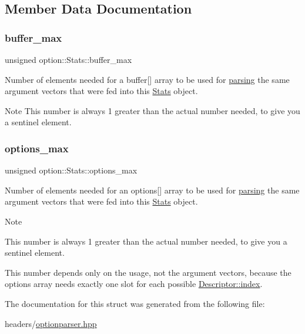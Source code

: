 \subsection{Member Data Documentation}
\mbox{\label{structoption_1_1Stats_a2c9a7b4174f91ba8bcadaa9ad6f0db06}} 
\subsubsection{\texorpdfstring{buffer\+\_\+max}{buffer\_max}}
{\footnotesize\ttfamily unsigned option\+::\+Stats\+::buffer\+\_\+max}



Number of elements needed for a {\ttfamily buffer}\mbox{[}\mbox{]} array to be used for \hyperlink{classoption_1_1Parser_a6e0b5778d1cfbd6cd51240e74d01e138}{parsing} the same argument vectors that were fed into this \hyperlink{structoption_1_1Stats}{Stats} object. 

\begin{DoxyNote}{Note}
This number is always 1 greater than the actual number needed, to give you a sentinel element. 
\end{DoxyNote}
\mbox{\label{structoption_1_1Stats_a8121787feb1c7db84fca3ccb012b0473}} 
\subsubsection{\texorpdfstring{options\+\_\+max}{options\_max}}
{\footnotesize\ttfamily unsigned option\+::\+Stats\+::options\+\_\+max}



Number of elements needed for an {\ttfamily options}\mbox{[}\mbox{]} array to be used for \hyperlink{classoption_1_1Parser_a6e0b5778d1cfbd6cd51240e74d01e138}{parsing} the same argument vectors that were fed into this \hyperlink{structoption_1_1Stats}{Stats} object. 

\begin{DoxyNote}{Note}
\begin{DoxyItemize}
\item This number is always 1 greater than the actual number needed, to give you a sentinel element. \item This number depends only on the {\ttfamily usage}, not the argument vectors, because the {\ttfamily options} array needs exactly one slot for each possible \hyperlink{structoption_1_1Descriptor_a1fee8ac44f529c99ac2b1149b4c391b1}{Descriptor\+::index}. \end{DoxyItemize}

\end{DoxyNote}


The documentation for this struct was generated from the following file\+:\begin{DoxyCompactItemize}
\item 
headers/\hyperlink{optionparser_8hpp}{optionparser.\+hpp}\end{DoxyCompactItemize}
